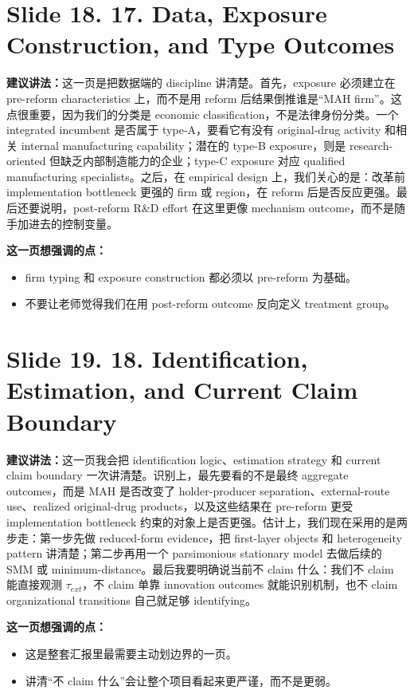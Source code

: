 \documentclass[12pt]{ctexart}
\begin{document}
\newpage
\section*{Slide 18. 17. Data, Exposure Construction, and Type Outcomes}
\textbf{建议讲法：}这一页是把数据端的 discipline 讲清楚。首先，exposure 必须建立在 pre-reform characteristics 上，而不是用 reform 后结果倒推谁是“MAH firm”。这点很重要，因为我们的分类是 economic classification，不是法律身份分类。一个 integrated incumbent 是否属于 type-A，要看它有没有 original-drug activity 和相关 internal manufacturing capability；潜在的 type-B exposure，则是 research-oriented 但缺乏内部制造能力的企业；type-C exposure 对应 qualified manufacturing specialists。之后，在 empirical design 上，我们关心的是：改革前 implementation bottleneck 更强的 firm 或 region，在 reform 后是否反应更强。最后还要说明，post-reform R\&D effort 在这里更像 mechanism outcome，而不是随手加进去的控制变量。

\vspace{0.5em}
\textbf{这一页想强调的点：}
\begin{itemize}
\item firm typing 和 exposure construction 都必须以 pre-reform 为基础。
\item 不要让老师觉得我们在用 post-reform outcome 反向定义 treatment group。
\end{itemize}

\newpage
\section*{Slide 19. 18. Identification, Estimation, and Current Claim Boundary}
\textbf{建议讲法：}这一页我会把 identification logic、estimation strategy 和 current claim boundary 一次讲清楚。识别上，最先要看的不是最终 aggregate outcomes，而是 MAH 是否改变了 holder-producer separation、external-route use、realized original-drug products，以及这些结果在 pre-reform 更受 implementation bottleneck 约束的对象上是否更强。估计上，我们现在采用的是两步走：第一步先做 reduced-form evidence，把 first-layer objects 和 heterogeneity pattern 讲清楚；第二步再用一个 parsimonious stationary model 去做后续的 SMM 或 minimum-distance。最后我要明确说当前不 claim 什么：我们不 claim 能直接观测 $\tau_{ext}$，不 claim 单靠 innovation outcomes 就能识别机制，也不 claim organizational transitions 自己就足够 identifying。

\vspace{0.5em}
\textbf{这一页想强调的点：}
\begin{itemize}
\item 这是整套汇报里最需要主动划边界的一页。
\item 讲清“不 claim 什么”会让整个项目看起来更严谨，而不是更弱。
\end{itemize}
\end{document}
